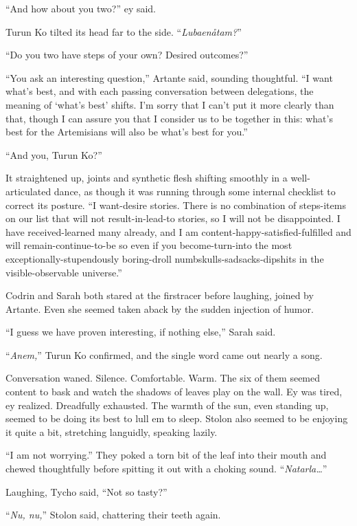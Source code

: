 ``And how about you two?'' ey said.

Turun Ko tilted its head far to the side. ``\emph{Lubaenåtam?}''

``Do you two have steps of your own? Desired outcomes?''

``You ask an interesting question,'' Artante said, sounding thoughtful. ``I want what's best, and with each passing conversation between delegations, the meaning of `what's best' shifts. I'm sorry that I can't put it more clearly than that, though I can assure you that I consider us to be together in this: what's best for the Artemisians will also be what's best for you.''

``And you, Turun Ko?''

It straightened up, joints and synthetic flesh shifting smoothly in a well-articulated dance, as though it was running through some internal checklist to correct its posture. ``I want-desire stories. There is no combination of steps-items on our list that will not result-in-lead-to stories, so I will not be disappointed. I have received-learned many already, and I am content-happy-satisfied-fulfilled and will remain-continue-to-be so even if you become-turn-into the most exceptionally-stupendously boring-droll numbskulls-sadsacks-dipshits in the visible-observable universe.''

Codrin and Sarah both stared at the firstracer before laughing, joined by Artante. Even she seemed taken aback by the sudden injection of humor.

``I guess we have proven interesting, if nothing else,'' Sarah said.

``\emph{Anem,}'' Turun Ko confirmed, and the single word came out nearly a song.

Conversation waned. Silence. Comfortable. Warm. The six of them seemed content to bask and watch the shadows of leaves play on the wall. Ey was tired, ey realized. Dreadfully exhausted. The warmth of the sun, even standing up, seemed to be doing its best to lull em to sleep. Stolon also seemed to be enjoying it quite a bit, stretching languidly, speaking lazily.

``I am not worrying.'' They poked a torn bit of the leaf into their mouth and chewed thoughtfully before spitting it out with a choking sound. ``\emph{Natarla\ldots{}}''

Laughing, Tycho said, ``Not so tasty?''

``\emph{Nu, nu,}'' Stolon said, chattering their teeth again.

